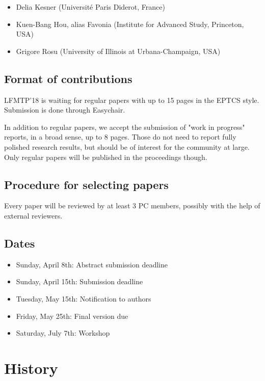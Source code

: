 \documentclass{article}
\begin{document}
\begin{itemize}
\item Delia Kesner (Universit\'{e} Paris Diderot, France)
\item Kuen-Bang Hou, alias Favonia (Institute for Advanced Study, Princeton, USA)
\item Grigore Rosu (University of Illinois at Urbana-Champaign, USA)
\end{itemize}

\subsection{Format of contributions}

LFMTP'18 is waiting for regular papers with up to 15 pages in the
EPTCS style. Submission is done through Easychair.

In addition to regular papers, we accept the submission of "work in
progress" reports, in a broad sense, up to 8 pages. Those do not need
to report fully polished research results, but should be of interest
for the community at large. Only regular papers will be published in
the proceedings though.

\subsection{Procedure for selecting papers}

Every paper will be reviewed by at least 3 PC members, possibly
with the help of external reviewers.

\subsection{Dates}

\begin{itemize}
\item Sunday, April 8th: Abstract submission deadline
\item Sunday, April 15th: Submission deadline
\item Tuesday, May 15th: Notification to authors
\item Friday, May 25th: Final version due
\item Saturday, July 7th: Workshop
\end{itemize}

\section{History}
\end{document}
